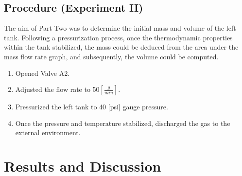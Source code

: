 \documentclass[12pt]{article}
\begin{document}
\subsection*{Procedure (Experiment II)}
The aim of Part Two was to determine the initial mass and volume of the left tank. Following a pressurization process, once the thermodynamic properties within the tank stabilized, the mass could be deduced from the area under the mass flow rate graph, and subsequently, the volume could be computed. 
\begin{enumerate}
    \item Opened Valve A2.
    \item Adjusted the flow rate to 50$\left[\frac{g}{min}\right]$.
    \item Pressurized the left tank to 40 [psi] gauge pressure. 
    \item Once the pressure and temperature stabilized, discharged the gas to the external environment.
\end{enumerate}

\section*{Results and Discussion}
\end{document}

